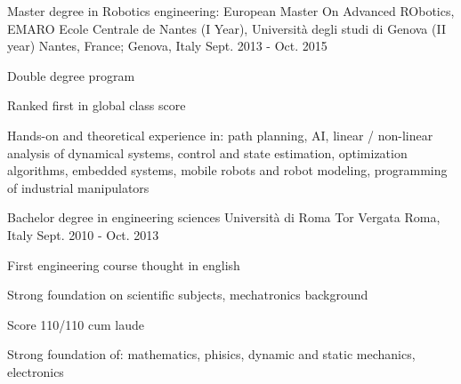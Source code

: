 





\begin{cventries}

  \cventry
    {Master degree in Robotics engineering: European Master On Advanced RObotics, EMARO} %
    {Ecole Centrale de Nantes (I Year), Università degli studi di Genova (II year)} %
    {Nantes, France; Genova, Italy} %
    {Sept. 2013 - Oct. 2015} %
    {
      \begin{cvitems} %
        \item{Double degree program}
        \item {Ranked first in global class score}
      \end{cvitems}
      \vspace{16pt}
      \begin{cvparagraph}
        Hands-on and theoretical experience in: path planning, AI, linear / non-linear analysis of dynamical systems, control and state estimation, optimization algorithms, embedded systems, mobile robots and robot modeling, programming of industrial manipulators
      \end{cvparagraph}
    }
    \cventry
    {Bachelor degree in engineering sciences} %
    {Università di Roma Tor Vergata} %
    {Roma, Italy} %
    {Sept. 2010 - Oct. 2013} %
    {
      \begin{cvitems} %
        \item {First engineering course thought in english}
        \item {Strong foundation on scientific subjects, mechatronics background}
        \item {Score 110/110 cum laude}
      \end{cvitems}
      \vspace{16pt}
      \begin{cvparagraph}
        Strong foundation of: mathematics, phisics, dynamic and static mechanics, electronics
      \end{cvparagraph}
      \vspace{-16pt}
    }

\end{cventries}
\vspace*{8pt}

